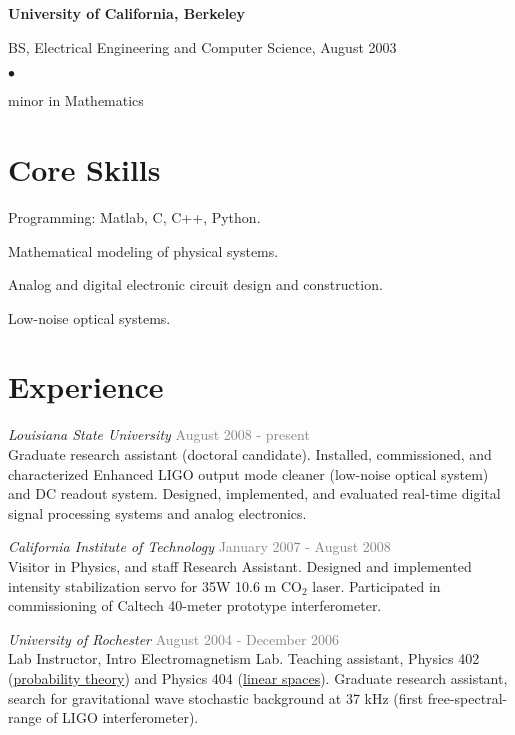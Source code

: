 \documentclass[margin,line]{res}
\newenvironment{list1}{
  \begin{list}{\ding{113}}{%
      \setlength{\itemsep}{0in}
      \setlength{\parsep}{0in} \setlength{\parskip}{0in}
      \setlength{\topsep}{0in} \setlength{\partopsep}{0in} 
      \setlength{\leftmargin}{0.17in}}}{\end{list}}
\newenvironment{list2}{
  \begin{list}{$\bullet$}{%
      \setlength{\itemsep}{0in}
      \setlength{\parsep}{0in} \setlength{\parskip}{0in}
      \setlength{\topsep}{0in} \setlength{\partopsep}{0in} 
      \setlength{\leftmargin}{0.2in}}}{\end{list}}
\begin{document}
\begin{resume}
{\bf University of California, Berkeley}\\
\vspace*{-.1in}
\begin{list1}
\item[] {\sc BS}, Electrical Engineering and Computer Science,  August 2003
\begin{list2}
\item[] minor in Mathematics
\end{list2}
\end{list1}

\section{\sc Core Skills} 
Programming: Matlab, C, C++, Python.

Mathematical modeling of physical systems.

Analog and digital electronic circuit design and construction.

Low-noise optical systems.
\section{\sc Experience}
\emph{Louisiana State University} \hfill { \textcolor{gray}{August 2008 - present} }\\
Graduate research assistant (doctoral candidate).  Installed,
commissioned, and characterized Enhanced LIGO output mode cleaner (low-noise optical system) and
DC readout system.  Designed, implemented, and evaluated real-time digital signal
processing systems and analog electronics.

\emph{California Institute of Technology} \hfill {\textcolor{gray}{January 2007 - August 2008}}\\
Visitor in Physics, and staff Research Assistant.  Designed and implemented
intensity stabilization servo for 35W 10.6 \textmu{}m $\mathrm{CO}_2$
laser. Participated in commissioning of Caltech 40-meter prototype
interferometer.


\emph{University of Rochester}  \hfill { \textcolor{gray}{August 2004 - December 2006}} \\
Lab Instructor, Intro Electromagnetism Lab.  Teaching assistant,
Physics 402
(\href{http://www.pas.rochester.edu/~tobin/teaching/phy402sp06/}{probability
  theory}) and Physics 404
(\href{http://www.pas.rochester.edu/~tobin/teaching/phy404sp06/}{linear
  spaces}).  Graduate research assistant, search for gravitational
wave stochastic background at 37 kHz (first free-spectral-range of
LIGO interferometer).


\end{resume}
\end{document}
